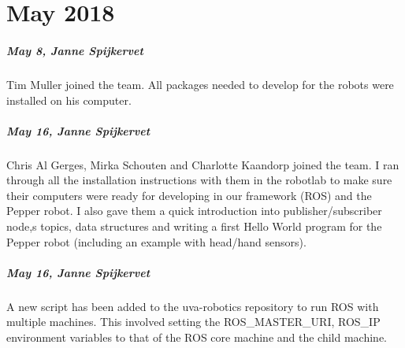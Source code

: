 
\chapter{May 2018}
\label{ch:may-2018}


\paragraph{May 8, Janne Spijkervet}
Tim Muller joined the team. All packages needed to develop for the robots were installed on his computer.

\paragraph{May 16, Janne Spijkervet}
Chris Al Gerges, Mirka Schouten and Charlotte Kaandorp joined the team. I ran through all the installation instructions with them in the robotlab to make sure their computers were ready for developing in our framework (ROS) and the Pepper robot. I also gave them a quick introduction into publisher/subscriber node,s topics, data structures and writing a first Hello World program for the Pepper robot (including an example with head/hand sensors).

\paragraph{May 16, Janne Spijkervet}
A new script has been added to the uva-robotics repository to run ROS with multiple machines. This involved setting the ROS\_MASTER\_URI, ROS\_IP environment variables to that of the ROS core machine and the child machine.
\bigskip
